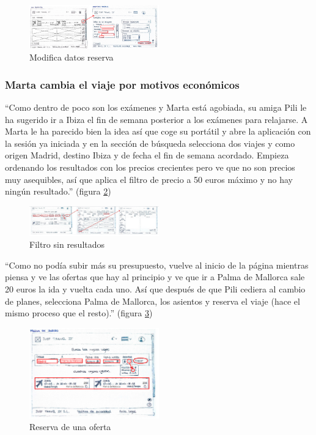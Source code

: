 \begin{figure}[h]
    \centering
    \includegraphics[width=0.5\textwidth]{Imagenes/Keypath/Marta5.png}
    \caption{Modifica datos reserva}
    \label{fig:Marta5}
\end{figure}

\subsubsection{Marta cambia el viaje por motivos económicos}
“Como dentro de poco son los exámenes y Marta está agobiada, su amiga Pili le ha sugerido ir a Ibiza el fin de semana posterior a los exámenes para relajarse. A 
Marta le ha parecido bien la idea así que coge su portátil y abre la aplicación con la sesión ya iniciada y en la sección de búsqueda selecciona dos viajes y 
como origen Madrid, destino Ibiza y de fecha el fin de semana acordado. Empieza ordenando los resultados con los precios crecientes pero ve que no son precios 
muy asequibles, así que aplica el filtro de precio a 50 euros máximo y no hay ningún resultado.” (figura \ref{fig:Marta6})
\begin{figure}[h]
    \centering
    \includegraphics[width=0.5\textwidth]{Imagenes/Keypath/Marta6.png}
    \caption{Filtro sin resultados}
    \label{fig:Marta6}
\end{figure}

“Como no podía subir más su presupuesto, vuelve al inicio de la página mientras piensa y ve las ofertas que hay al principio y ve que ir a Palma de Mallorca sale 
20 euros la ida y vuelta cada uno. Así que después de que Pili cediera al cambio de planes, selecciona Palma de Mallorca, los asientos y reserva el viaje 
(hace el mismo proceso que el resto).” (figura \ref{fig:Marta7})
\begin{figure}[h]
    \centering
    \includegraphics[width=0.5\textwidth]{Imagenes/Keypath/Marta7.png}
    \caption{Reserva de una oferta}
    \label{fig:Marta7}
\end{figure}

